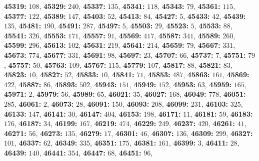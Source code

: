 \textsf{\bfseries 45319:} $108$, \textsf{\bfseries 45329:} $240$, \textsf{\bfseries 45337:} $135$, \textsf{\bfseries 45341:} $118$, \textsf{\bfseries 45343:} $79$, \textsf{\bfseries 45361:} $115$, \textsf{\bfseries 45377:} $122$, \textsf{\bfseries 45389:} $147$, \textsf{\bfseries 45403:} $52$, \textsf{\bfseries 45413:} $84$, \textsf{\bfseries 45427:} $5$, \textsf{\bfseries 45433:} $42$, \textsf{\bfseries 45439:} $135$, \textsf{\bfseries 45481:} $190$, \textsf{\bfseries 45491:} $287$, \textsf{\bfseries 45497:} $5$, \textsf{\bfseries 45503:} $29$, \textsf{\bfseries 45523:} $5$, \textsf{\bfseries 45533:} $88$, \textsf{\bfseries 45541:} $326$, \textsf{\bfseries 45553:} $171$, \textsf{\bfseries 45557:} $91$, \textsf{\bfseries 45569:} $417$, \textsf{\bfseries 45587:} $341$, \textsf{\bfseries 45589:} $260$, \textsf{\bfseries 45599:} $296$, \textsf{\bfseries 45613:} $102$, \textsf{\bfseries 45631:} $219$, \textsf{\bfseries 45641:} $214$, \textsf{\bfseries 45659:} $79$, \textsf{\bfseries 45667:} $331$, \textsf{\bfseries 45673:} $774$, \textsf{\bfseries 45677:} $331$, \textsf{\bfseries 45691:} $98$, \textsf{\bfseries 45697:} $23$, \textsf{\bfseries 45707:} $66$, \textsf{\bfseries 45737:} $7$, \textsf{\bfseries 45751:} $79$, \textsf{\bfseries 45757:} $50$, \textsf{\bfseries 45763:} $109$, \textsf{\bfseries 45767:} $115$, \textsf{\bfseries 45779:} $107$, \textsf{\bfseries 45817:} $88$, \textsf{\bfseries 45821:} $83$, \textsf{\bfseries 45823:} $10$, \textsf{\bfseries 45827:} $52$, \textsf{\bfseries 45833:} $10$, \textsf{\bfseries 45841:} $71$, \textsf{\bfseries 45853:} $487$, \textsf{\bfseries 45863:} $161$, \textsf{\bfseries 45869:} $422$, \textsf{\bfseries 45887:} $86$, \textsf{\bfseries 45893:} $502$, \textsf{\bfseries 45943:} $151$, \textsf{\bfseries 45949:} $152$, \textsf{\bfseries 45953:} $63$, \textsf{\bfseries 45959:} $165$, \textsf{\bfseries 45971:} $2$, \textsf{\bfseries 45979:} $56$, \textsf{\bfseries 45989:} $65$, \textsf{\bfseries 46021:} $35$, \textsf{\bfseries 46027:} $168$, \textsf{\bfseries 46049:} $778$, \textsf{\bfseries 46051:} $285$, \textsf{\bfseries 46061:} $2$, \textsf{\bfseries 46073:} $28$, \textsf{\bfseries 46091:} $150$, \textsf{\bfseries 46093:} $208$, \textsf{\bfseries 46099:} $231$, \textsf{\bfseries 46103:} $325$, \textsf{\bfseries 46133:} $147$, \textsf{\bfseries 46141:} $30$, \textsf{\bfseries 46147:} $404$, \textsf{\bfseries 46153:} $198$, \textsf{\bfseries 46171:} $11$, \textsf{\bfseries 46181:} $59$, \textsf{\bfseries 46183:} $176$, \textsf{\bfseries 46187:} $34$, \textsf{\bfseries 46199:} $167$, \textsf{\bfseries 46219:} $474$, \textsf{\bfseries 46229:} $249$, \textsf{\bfseries 46237:} $420$, \textsf{\bfseries 46261:} $41$, \textsf{\bfseries 46271:} $56$, \textsf{\bfseries 46273:} $135$, \textsf{\bfseries 46279:} $17$, \textsf{\bfseries 46301:} $46$, \textsf{\bfseries 46307:} $136$, \textsf{\bfseries 46309:} $299$, \textsf{\bfseries 46327:} $101$, \textsf{\bfseries 46337:} $62$, \textsf{\bfseries 46349:} $335$, \textsf{\bfseries 46351:} $175$, \textsf{\bfseries 46381:} $161$, \textsf{\bfseries 46399:} $3$, \textsf{\bfseries 46411:} $28$, \textsf{\bfseries 46439:} $140$, \textsf{\bfseries 46441:} $354$, \textsf{\bfseries 46447:} $68$, \textsf{\bfseries 46451:} $96$, 
